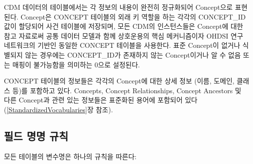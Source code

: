 \documentclass[11pt]{book}
\theoremstyle{definition}
\theoremstyle{definition}
\theoremstyle{definition}
\theoremstyle{remark}
\begin{document}
CDM 데이터의 테이블에서는 각 정보의 내용이 완전히 정규화되어 Concept으로
표현된다. Concept은 CONCEPT 테이블의 외래 키 역할을 하는 각각의
CONCEPT\_ID 값이 할당되어 사건 테이블에 저장되며, 모든 CDM의
인스턴스들은 Concept에 대한 참고 자료로써 공통 데이터 모델과 함께
상호운용의 핵심 메커니즘이자 OHDSI 연구 네트워크의 기반인 동일한 CONCEPT
테이블을 사용한다. 표준 Concept이 없거나 식별되지 않는 경우에는
CONCEPT\_ID가 존재하지 않는 Concept이거나 알 수 없음 또는 매핑이
불가능함을 의미하는 0으로 설정된다.

CONCEPT 테이블의 정보들은 각각의 Concept에 대한 상세 정보 (이름, 도메인,
클래스 등)를 포함하고 있다. Concepts, Concept Relationships, Concept
Ancestors 및 다른 Concept과 관련 있는 정보들은 표준화된 용어에 포함되어
있다 (\ref{StandardizedVocabularies}장 참조).

\subsection{필드 명명 규칙}\label{--}

모든 테이블의 변수명은 하나의 규칙을 따른다:
\end{document}
